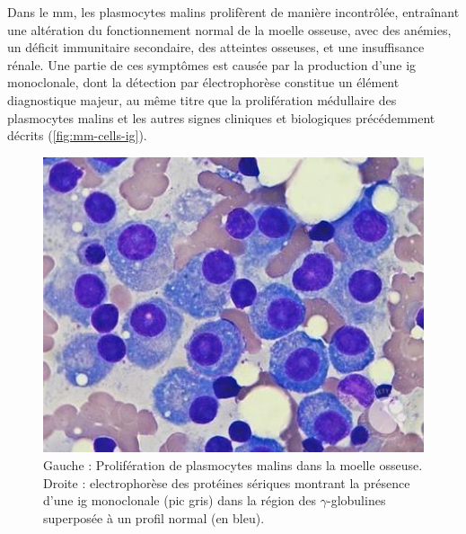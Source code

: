 Dans le \gls{mm}, les plasmocytes malins prolifèrent de manière incontrôlée,
entraînant une altération du fonctionnement normal de la moelle osseuse, avec
des anémies, un déficit immunitaire secondaire, des atteintes osseuses, et une
insuffisance rénale. Une partie de ces symptômes est causée par la production
d'une \gls{ig} monoclonale, dont la détection par électrophorèse constitue un
élément diagnostique majeur, au même titre que la prolifération médullaire des
plasmocytes malins et les autres signes cliniques et biologiques précédemment
décrits \cite{cowanDiagnosisManagementMultiple2022a}
(\autoref{fig:mm-cells-ig}).

\begin{figure}[H]
    \begin{minipage}{0.40\textwidth}
        \centering
        \includegraphics[width=1\textwidth]{images/mm_cells.jpeg}
    \end{minipage}
    \hspace{0.05\textwidth} 
    \begin{minipage}{0.50\textwidth}
        \centering
        
    \end{minipage}
    \caption{Gauche : Prolifération de plasmocytes malins dans la moelle osseuse.
        Droite : electrophorèse des protéines sériques montrant la présence d'une 
        \colorbox{black!20}{\gls{ig} monoclonale (pic gris)} dans la région des $\gamma$-globulines 
        superposée à un \colorbox{blue!20}{profil normal (en bleu)}.}
    \label{fig:mm-cells-ig}
\end{figure}

